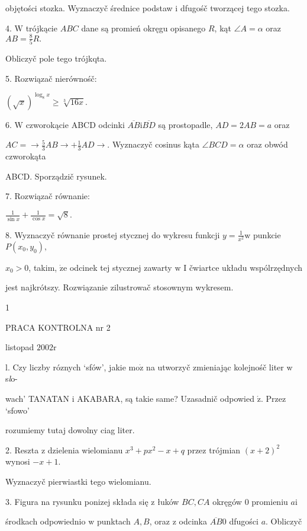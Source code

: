 \documentclass[a4paper,12pt]{article}
\begin{document}
objętości stozka. Wyznaczyč średnice podstaw $\mathrm{i}$ dfugośč tworzącej tego stozka.

4. $\mathrm{W}$ trójkącie $ABC$ dane są promień okręgu opisanego $R$, kąt $\angle A=\alpha$ oraz $AB=\displaystyle \frac{8}{5}R.$

Obliczyč pole tego trójkqta.

5. Rozwiązač nierównośč:

$(\sqrt{x})^{\log_{8}x}\geq\sqrt[3]{16x}.$

6. $\mathrm{W}$ czworokącie ABCD odcinki $\overline{AB}\mathrm{i}\overline{BD}$ są prostopadle, $AD = 2AB =a$ oraz

$ AC=\rightarrow \displaystyle \frac{5}{3}AB\rightarrow+\frac{1}{3}AD\rightarrow$. Wyznaczyč cosinus kąta $\angle BCD=\alpha$ oraz obwód czworokąta

ABCD. Sporządzič rysunek.

7. Rozwiązač równanie:

$\displaystyle \frac{1}{\sin x}+\frac{1}{\cos x}=\sqrt{8}.$

8. Wyznaczyč równanie prostej stycznej do wykresu funkcji $y=\displaystyle \frac{1}{x^{2}}\mathrm{w}$ punkcie $P(x_{0},y_{0}),$

$x_{0}>0$, takim, $\dot{\mathrm{z}}\mathrm{e}$ odcinek tej stycznej zawarty $\mathrm{w}$ I čwiartce układu wspólrzędnych

jest najkrótszy. Rozwiązanie zilustrowač stosownym wykresem.

1




PRACA KONTROLNA nr 2

listopad $2002\mathrm{r}$

l. Czy liczby róznych `sfów', jakie $\mathrm{m}\mathrm{o}\dot{\mathrm{z}}$ na utworzyč zmieniając kolejnośč liter $\mathrm{w}$ s{\it l}o-

wach' TANATAN $\mathrm{i}$ AKABARA, są takie same? Uzasadnič odpowied $\acute{\mathrm{z}}$. Przez `sfowo'

rozumiemy tutaj dowolny ciag liter.

2. Reszta $\mathrm{z}$ dzielenia wielomianu $x^{3}+px^{2}-x+q$ przez trójmian $(x+2)^{2}$ wynosi $-x+1.$

Wyznaczyč pierwiastki tego wielomianu.

3. Figura na rysunku ponizej składa się $\mathrm{z}$ łuków $BC, CA$ okręgów $0$ promieniu $a\mathrm{i}$

środkach odpowiednio $\mathrm{w}$ punktach $A, B$, oraz $\mathrm{z}$ odcinka $\overline{AB}0$ dfugości $a$. Obliczyč
\end{document}
